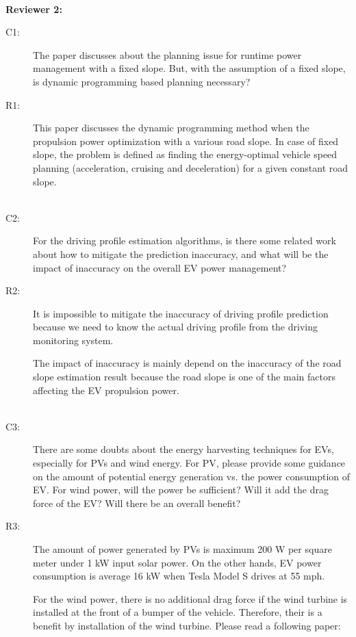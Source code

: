 \documentclass[onecolumn]{IEEEconf}
\begin{document}
\begin{description}
~\\

\end{description}

\pagebreak


\textbf{Reviewer 2:}
\begin{description}
\item [C1: ] The paper discusses about the planning issue for runtime power management with a fixed slope. But, with the assumption of a fixed slope, is dynamic programming based planning necessary?
\item [R1: ] This paper discusses the dynamic programming method when the propulsion power optimization with a various road slope. In case of fixed slope, the problem is defined as finding the energy-optimal vehicle speed planning (acceleration, cruising and deceleration) for a given constant road slope.\\
~\\

\item [C2: ] For the driving profile estimation algorithms, is there some related work about how to mitigate the prediction inaccuracy, and what will be the impact of inaccuracy on the overall EV power management?
\item [R2: ] It is impossible to mitigate the inaccuracy of driving profile prediction because we need to know the actual driving profile from the driving monitoring system. 

The impact of inaccuracy is mainly depend on the inaccuracy of the road slope estimation result because the road slope is one of the main factors affecting the EV propulsion power.\\
~\\

\item [C3: ] There are some doubts about the energy harvesting techniques for EVs, especially for PVs and wind energy. For PV, please provide some guidance on the amount of potential energy generation vs. the power consumption of EV. For wind power, will the power be sufficient? Will it add the drag force of the EV? Will there be an overall benefit?
\item [R3: ] The amount of power generated by PVs is maximum 200 W per square meter under 1 kW input solar power. On the other hands, EV power consumption is average 16 kW when Tesla Model S drives at 55 mph.

For the wind power, there is no additional drag force if the wind turbine is installed at the front of a bumper of the vehicle. Therefore, their is a benefit by installation of the wind turbine. Please read a following paper:\\


\end{description}
\end{document}
